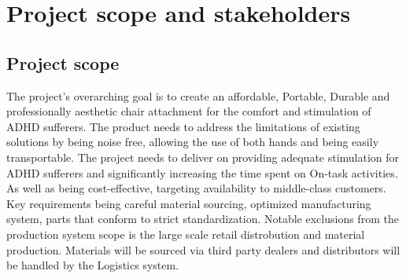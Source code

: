 \documentclass{article}
\begin{document}
  \section{Project scope and stakeholders}
  \subsection{Project scope}
  The project's overarching goal is to create an affordable, Portable, Durable
  and professionally aesthetic chair attachment for the comfort and stimulation
  of ADHD sufferers. The product needs to address the limitations of existing
solutions by being noise free, allowing the use of both hands and being easily
  transportable. The project needs to deliver on providing adequate stimulation
  for ADHD sufferers and significantly increasing the time spent on On-task
  activities. As well as being cost-effective, targeting availability to middle-class
  customers. Key requirements being careful material sourcing, optimized
  manufacturing system, parts that conform to strict standardization. Notable
  exclusions from the production system scope is the large
  scale retail distrobution and material production. Materials will be sourced
  via third party dealers and distributors will be handled by the Logistics
  system.
\end{document}
